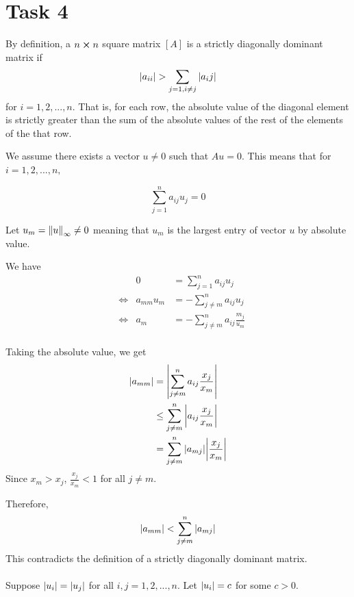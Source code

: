 \documentclass{article}
\begin{document}
\section{Task 4}
By definition, a $n \cross n$ square matrix $[A]$ is a strictly diagonally dominant matrix if
$$
\abs{a_{ii}} > \sum_{j=1, i\neq j} \abs{a_ij}
$$
for $i=1,2,...,n$.
That is, for each row, the absolute value of the diagonal element is strictly greater than the sum of the absolute values of the rest of the elements of the that row.

We assume there exists a vector $u \neq 0$ such that $Au=0$. This means that for $i=1,2,...,n,$


$$ 
\sum_{j=1}^n a_{ij}u_j = 0
$$

Let $u_m = \norm{u}_\infty \neq 0$ meaning that $u_m$ is the largest entry of vector $u$ by absolute value.

We have
\begin{equation*}
    \begin{aligned}
    & &0 &= \sum_{j=1}^n a_{ij}u_j \\
    &\iff &a_{mm}u_m &= - \sum_{j\neq m}^n a_{ij}u_j \\
    &\iff &a_{m} &= - \sum_{j\neq m}^n a_{ij} \frac{m_j}{u_m} \\
    \end{aligned}
\end{equation*}

Taking the absolute value, we get
\begin{equation*}
    \begin{aligned}
        \abs{a_{mm}} &= \abs{\sum_{j\neq m}^n a_{ij} \frac{x_j}{x_m}}\\
        &\leq \sum_{j\neq m}^n \abs{a_{ij} \frac{x_j}{x_m}} \\
        &= \sum_{j\neq m}^n \abs{a_{mj}}\abs{\frac{x_j}{x_m}}
    \end{aligned}
\end{equation*}
Since $x_m > x_j$, $\frac{x_j}{x_m}<1$ for all $j\neq m$.

Therefore, 
$$
\abs{a_{mm}} < \sum_{j\neq m}^n \abs{a_{mj}}
$$
This contradicts the definition of a strictly diagonally dominant matrix.
\\
\\
Suppose $\abs{u_i} = \abs{u_j}$ for all $i,j = 1,2,...,n$. Let $\abs{u_i} = c$ for some $c>0$. 

\\
\\ 
\end{document}
